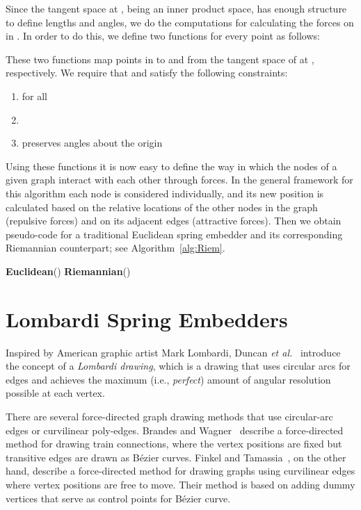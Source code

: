 \documentclass[notitlepage,letter,11pt]{article}
\begin{document}
Since the tangent space at , being an inner product space, has
enough structure to define lengths and angles, we do the computations
for calculating the forces on  in .  In order to do this, we
define two functions for every point  as follows:


These two functions map points in  to and
from the tangent space of  at , respectively. We require that
 and  satisfy the following constraints:



\begin{enumerate}
    \item  for all 
    \item 
    \item  preserves angles about the origin
\end{enumerate}

Using these functions it is now easy to define the way in which the
nodes of a given graph  interact with each other through
forces.  In the general framework for this algorithm each node is
considered individually, and its new position is calculated based on
the relative locations of the other nodes in the graph (repulsive
forces) and on its adjacent edges (attractive forces). Then we obtain
pseudo-code for a traditional Euclidean spring embedder and its
corresponding Riemannian counterpart; see Algorithm~\ref{alg:Riem}.

\begin{algorithm}
{\bf Euclidean}() 
\For{ \KwTo }{
\ForEach{}{

}
}
 {\bf Riemannian}() 
 \For{ \KwTo }{
\ForEach{}{
        \;
        \;
        \;
        \;
}
}
\caption{Euclidean and Riemannian\label{alg:Riem}}
\end{algorithm}

\section{Lombardi Spring Embedders}
\label{fd:sec:lom}

Inspired by American graphic artist Mark Lombardi, Duncan {\it et al.}~\cite{degkn-dtwpa-10,degkn-ldg-10}
introduce the concept of a \emph{Lombardi drawing}, which is a
drawing that uses circular arcs for edges and achieves the maximum
(i.e., \emph{perfect}) amount of angular resolution possible at each
vertex. 

There are several force-directed graph drawing methods
that use circular-arc edges or curvilinear poly-edges.
Brandes and Wagner~\cite{DBLP:journals/jgaa/BrandesW00}
describe a force-directed method for drawing train connections, where the vertex positions are fixed
but transitive edges are drawn as B{\'e}zier curves.
Finkel and Tamassia~\cite{ft-cgduf-05}, on the other hand,
describe a force-directed
method for drawing graphs using curvilinear edges where vertex
positions are free to move. Their method is
based on adding dummy vertices that serve as control points for B{\'e}zier curve.
\end{document}

